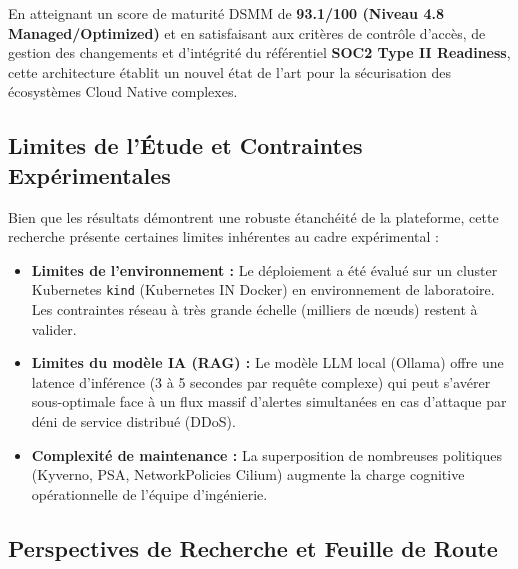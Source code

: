 En atteignant un score de maturité DSMM de \textbf{93.1/100 (Niveau 4.8 Managed/Optimized)} et en satisfaisant aux critères de contrôle d'accès, de gestion des changements et d'intégrité du référentiel \textbf{SOC2 Type II Readiness}, cette architecture établit un nouvel état de l'art pour la sécurisation des écosystèmes Cloud Native complexes.


\subsection{Limites de l'Étude et Contraintes Expérimentales}
Bien que les résultats démontrent une robuste étanchéité de la plateforme, cette recherche présente certaines limites inhérentes au cadre expérimental :
\begin{itemize}
    \item \textbf{Limites de l'environnement :} Le déploiement a été évalué sur un cluster Kubernetes \texttt{kind} (Kubernetes IN Docker) en environnement de laboratoire. Les contraintes réseau à très grande échelle (milliers de nœuds) restent à valider.
    \item \textbf{Limites du modèle IA (RAG) :} Le modèle LLM local (Ollama) offre une latence d'inférence (3 à 5 secondes par requête complexe) qui peut s'avérer sous-optimale face à un flux massif d'alertes simultanées en cas d'attaque par déni de service distribué (DDoS).
    \item \textbf{Complexité de maintenance :} La superposition de nombreuses politiques (Kyverno, PSA, NetworkPolicies Cilium) augmente la charge cognitive opérationnelle de l'équipe d'ingénierie.
\end{itemize}

\subsection{Perspectives de Recherche et Feuille de Route}

